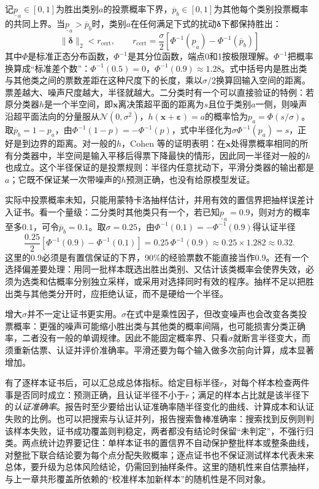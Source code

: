 记$\underline p_a\in[0,1]$为胜出类别$a$的投票概率下界，$\overline p_b\in[0,1]$为其他每个类别投票概率的共同上界。当$\underline p_a>\overline p_b$时，类别$a$在任何满足下式的扰动$\bm\delta$下都保持胜出：
\begin{equation}
 \lVert\bm{\delta}\rVert_2<r_{\mathrm{cert}},
 \qquad
 r_{\mathrm{cert}}
 =\frac{\sigma}{2}
 \left[\Phi^{-1}(\underline p_a)
       -\Phi^{-1}(\overline p_b)\right]
 \label{eq:robustness-smoothing-radius}
\end{equation}
其中$\Phi$是标准正态分布函数，$\Phi^{-1}$是其分位函数，端点0和1按极限理解。$\Phi^{-1}$把概率换算成“标准差个数”：$\Phi^{-1}(0.5)=0$，$\Phi^{-1}(0.9)\approx1.28$。式中括号内是胜出类与其他类之间的票数差距在这种尺度下的长度，乘以$\sigma/2$换算回输入空间的距离。票差越大、噪声尺度越大，半径就越大。二分类时有一个可以直接验证的特例：若原分类器$h$是一个半空间，即$\bm x$离决策超平面的距离为$s$且位于类别$a$一侧，则噪声沿超平面法向的分量服从$\mathcal N(0,\sigma^2)$，$h(\bm x+\bm\varepsilon)=a$的概率恰为$p_a=\Phi(s/\sigma)$。取$\overline p_b=1-p_a$，由$\Phi^{-1}(1-p)=-\Phi^{-1}(p)$，式中半径化为$\sigma\Phi^{-1}(p_a)=s$，正好是到边界的距离。对一般的$h$，Cohen 等的证明表明：在$\bm x$处得票概率相同的所有分类器中，半空间是输入平移后得票下降最快的情形，因此同一半径对一般的$h$也成立。这个半径保证的是投票规则：半径内任意扰动下，平滑分类器的输出都是$a$；它既不保证某一次带噪声的$h$预测正确，也没有给原模型发证。

实际中投票概率未知，只能用蒙特卡洛抽样估计，并用有效的置信界把抽样误差计入证书。看一个量级：二分类时其他类只有一个，若已知$\underline p_a=0.9$，则对方的概率至多$0.1$，可令$\overline p_b=0.1$。取$\sigma=0.25$，由$\Phi^{-1}(0.1)=-\Phi^{-1}(0.9)$得认证半径
\[
 \frac{0.25}{2}[\Phi^{-1}(0.9)-\Phi^{-1}(0.1)]=0.25\,\Phi^{-1}(0.9)\approx0.25\times1.282\approx0.32.
\]
这里的0.9必须是有置信保证的下界，90\%的经验票数不能直接当作0.9。还有一个选择偏差要处理：用同一批样本既选出胜出类别、又估计该类概率会使界失效，必须为选类和估概率分别独立采样，或采用对选择同时有效的程序。抽样不足以把胜出类与其他类分开时，应拒绝认证，而不是硬给一个半径。

增大$\sigma$并不一定让证书更实用。$\sigma$在式中是乘性因子，但改变噪声也会改变各类投票概率：更强的噪声可能缩小胜出类与其他类的概率间隔，也可能损害分类正确率，二者没有一般的单调规律。因此不能固定概率界、只看$\sigma$就断言半径变大，而须重新估票、认证并评价准确率。平滑还要为每个输入做多次前向计算，成本显著增加。

有了逐样本证书后，可以汇总成总体指标。给定目标半径$r$，对每个样本检查两件事是否同时成立：预测正确，且认证半径不小于$r$；满足的样本占比就是该半径下的\emph{认证准确率}。报告时至少要给出认证准确率随半径变化的曲线、计算成本和认证失败的比例。也可以把搜索与认证并列，报告搜索鲁棒准确率：搜索找到反例则判该样本失败，证书成功覆盖则判稳定，两者都没有结论时保留“未判定”，不强行归类。两点统计边界要记住：单样本证书的置信界不自动保护整批样本或整条曲线，对整批下联合结论要为每个点分配失败概率；逐点证书也不保证测试样本代表未来总体，要升级为总体风险结论，仍需回到抽样条件。这里的随机性来自估票抽样，与上一章共形覆盖所依赖的“校准样本加新样本”的随机性是不同对象。

